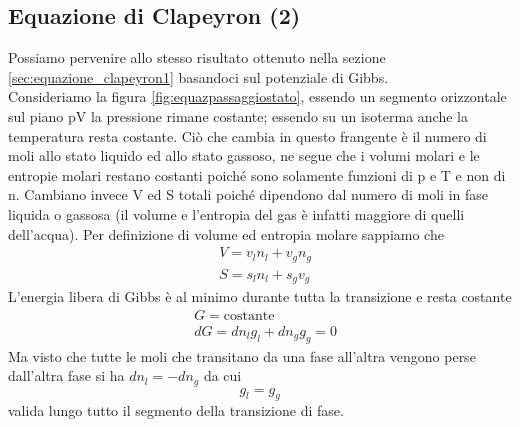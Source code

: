 \documentclass[
10pt, %
a4paper, %
oneside, %
headinclude,footinclude, %
BCOR5mm, %
]{scrartcl}
\begin{document}
\subsection{Equazione di Clapeyron (2)}
Possiamo pervenire allo stesso risultato ottenuto nella sezione \ref{sec:equazione_clapeyron1} basandoci sul potenziale di Gibbs.\\
Consideriamo la figura \ref{fig:equazpassaggiostato}, essendo un segmento orizzontale sul piano pV la pressione rimane costante; essendo su un isoterma anche la temperatura resta costante. Ciò che cambia in questo frangente è il numero di moli allo stato liquido ed allo stato gassoso, ne segue che i volumi molari e le entropie molari restano costanti poiché sono solamente funzioni di p e T e non di n. Cambiano invece V ed S totali poiché dipendono dal numero di moli in fase liquida o gassosa (il volume e l'entropia del gas è infatti maggiore di quelli dell'acqua). Per definizione di volume ed entropia molare sappiamo che 
\begin{align*}
	&V = v_l n_l + v_g n_g\\
	&S = s_l n_l + s_g v_g
\end{align*}
L'energia libera di Gibbs è al minimo durante tutta la transizione e resta costante 
\begin{align*}
	&G = \text{costante}\\
	&dG = dn_l g_l + dn_g g_g =  0
\end{align*}
Ma visto che tutte le moli che transitano da una fase all'altra vengono perse dall'altra fase si ha 
\(dn_l = -dn_g\) da cui
\[g_l = g_g\]
valida lungo tutto il segmento della transizione di fase.\\
\end{document}
